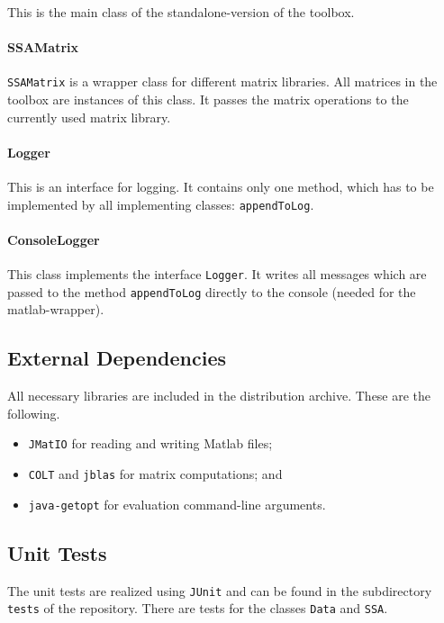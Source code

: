 \documentclass{article}
\newcommand{\1}{\ensuremath{\mathds{1}}}
\newcommand{\0}{\ensuremath{0}}
\begin{document}
This is the main class of the standalone-version of the toolbox.

\paragraph{SSAMatrix}

\texttt{SSAMatrix} is a wrapper class for different matrix libraries. All matrices in the toolbox are instances of this class. It passes the
matrix operations to the currently used matrix library.

\paragraph{Logger}

This is an interface for logging. It contains only one method, which has to be implemented by all implementing classes: \texttt{appendToLog}.

\paragraph{ConsoleLogger}

This class implements the interface \texttt{Logger}. It writes all messages which are passed to the method
\texttt{appendToLog} directly to the console (needed for the matlab-wrapper).

\subsection*{External Dependencies}

All necessary libraries are included in the distribution archive. These are the following. 
\begin{itemize}
	\item \texttt{JMatIO} for reading and writing Matlab files;
	
 	\item \texttt{COLT} and \texttt{jblas} for matrix computations; and

	\item \texttt{java-getopt} for evaluation command-line arguments.	

\end{itemize}



\subsection*{Unit Tests}
The unit tests are realized using \texttt{JUnit} and can be found in the subdirectory \texttt{tests} of the repository.
There are tests for the classes \texttt{Data} and \texttt{SSA}.
\end{document}
